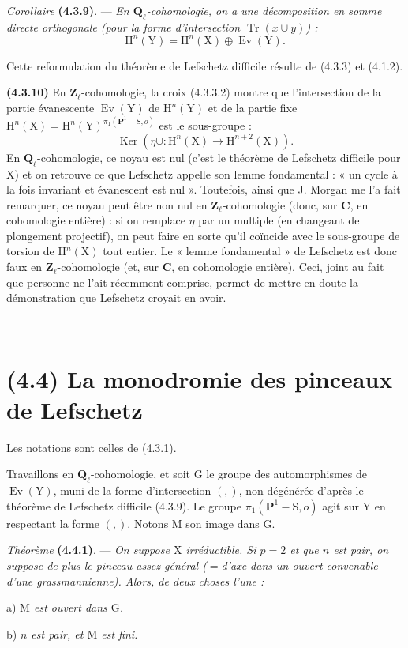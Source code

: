 \documentclass[11pt,leqno]{article}
\newcommand{\Page}[1]{\ifvmode\noindent\else\unskip\ \fi{\footnotesize\textcolor{gray}{[p.\,#1]}}\ \ignorespaces}
\begin{document}
\textit{Corollaire} \textbf{(4.3.9)}. — \textit{En \(\mathbf{Q}_\ell\)-cohomologie, on a une décomposition en somme directe orthogonale (pour la forme d’intersection \(\operatorname{Tr}(x\cup y)\)) :}
\[
\mathrm{H}^n(\mathrm{Y})=\mathrm{H}^n(\mathrm{X})\oplus\operatorname{Ev}(\mathrm{Y}).
\]

Cette reformulation du théorème de Lefschetz difficile résulte de (4.3.3) et (4.1.2).

\textbf{(4.3.10)} En \(\mathbf{Z}_\ell\)-cohomologie, la croix (4.3.3.2) montre que l’intersection de la partie évanescente \(\operatorname{Ev}(\mathrm{Y})\) de \(\mathrm{H}^n(\mathrm{Y})\) et de la partie fixe \(\mathrm{H}^n(\mathrm{X})=\mathrm{H}^n(\mathrm{Y})^{\pi_1(\mathbf{P}^1-\mathrm{S},o)}\) est le sous-groupe :
\[
\operatorname{Ker}(\eta\cup:\mathrm{H}^n(\mathrm{X})\to\mathrm{H}^{n+2}(\mathrm{X})).
\]
En \(\mathbf{Q}_\ell\)-cohomologie, ce noyau est nul (c’est le théorème de Lefschetz difficile pour \(\mathrm{X}\)) et on retrouve ce que Lefschetz appelle son lemme fondamental : « un cycle à la fois invariant et évanescent est nul ». Toutefois, ainsi que J. Morgan me l’a fait remarquer, ce noyau peut être non nul en \(\mathbf{Z}_\ell\)-cohomologie (donc, sur \(\mathbf{C}\), en cohomologie entière) : si on remplace \(\eta\) par un multiple (en changeant de plongement projectif), on peut faire en sorte qu’il coïncide avec le sous-groupe de torsion de \(\mathrm{H}^n(\mathrm{X})\) tout entier. Le « lemme fondamental » de Lefschetz est donc faux en \(\mathbf{Z}_\ell\)-cohomologie (et, sur \(\mathbf{C}\), en cohomologie entière). Ceci, joint au fait que personne ne l’ait récemment comprise, permet de mettre en doute la démonstration que Lefschetz croyait en avoir.

\Page{227}
\section*{(4.4) La monodromie des pinceaux de Lefschetz}

Les notations sont celles de (4.3.1).

Travaillons en \(\mathbf{Q}_\ell\)-cohomologie, et soit \(\mathrm{G}\) le groupe des automorphismes de \(\operatorname{Ev}(\mathrm{Y})\), muni de la forme d’intersection \((,)\), non dégénérée d’après le théorème de Lefschetz difficile (4.3.9). Le groupe \(\pi_1(\mathbf{P}^1-\mathrm{S},o)\) agit sur \(\mathrm{Y}\) en respectant la forme \((,)\). Notons \(\mathrm{M}\) son image dans \(\mathrm{G}\).

\textit{Théorème} \textbf{(4.4.1)}. — \textit{On suppose \(\mathrm{X}\) irréductible. Si \(p=2\) et que \(n\) est pair, on suppose de plus le pinceau assez général (\(=\)d’axe dans un ouvert convenable d’une grassmannienne). Alors, de deux choses l’une :}
\par\noindent a) \textit{\(\mathrm{M}\) est ouvert dans \(\mathrm{G}\).}
\par\noindent b) \textit{\(n\) est pair, et \(\mathrm{M}\) est fini.}
\end{document}
